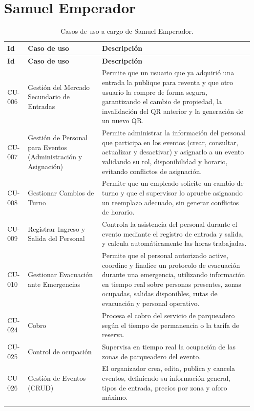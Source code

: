 \documentclass[11pt,a4paper]{article}
\begin{document}
\newpage

\section{Samuel Emperador}

\begin{longtable}{P{1.6cm}P{4cm}P{9.4cm}}
\toprule
\textbf{Id} & \textbf{Caso de uso} & \textbf{Descripción}\\
\midrule
\endfirsthead
\toprule
\textbf{Id} & \textbf{Caso de uso} & \textbf{Descripción}\\
\midrule
\endhead

CU-006 & Gestión del Mercado Secundario de Entradas &
Permite que un usuario que ya adquirió una entrada la publique para reventa y que otro usuario
la compre de forma segura, garantizando el cambio de propiedad, la invalidación del QR anterior
y la generación de un nuevo QR.\\[0.5em]

CU-007 & Gestión de Personal para Eventos (Administración y Asignación) &
Permite administrar la información del personal que participa en los eventos (crear, consultar,
actualizar y desactivar) y asignarlo a un evento validando su rol, disponibilidad y horario,
evitando conflictos de asignación.\\[0.5em]

CU-008 & Gestionar Cambios de Turno &
Permite que un empleado solicite un cambio de turno y que el supervisor lo apruebe asignando un
reemplazo adecuado, sin generar conflictos de horario.\\[0.5em]

CU-009 & Registrar Ingreso y Salida del Personal &
Controla la asistencia del personal durante el evento mediante el registro de entrada y salida,
y calcula automáticamente las horas trabajadas.\\[0.5em]

CU-010 & Gestionar Evacuación ante Emergencias &
Permite que el personal autorizado active, coordine y finalice un protocolo de evacuación
durante una emergencia, utilizando información en tiempo real sobre personas presentes, zonas
ocupadas, salidas disponibles, rutas de evacuación y personal operativo.\\[0.5em]

CU-024 & Cobro &
Procesa el cobro del servicio de parqueadero según el tiempo de permanencia o la tarifa de
reserva.\\[0.5em]

CU-025 & Control de ocupación &
Supervisa en tiempo real la ocupación de las zonas de parqueadero del evento.\\[0.5em]

CU-026 & Gestión de Eventos (CRUD) &
El organizador crea, edita, publica y cancela eventos, definiendo su información general, tipos
de entrada, precios por zona y aforo máximo.\\
\bottomrule
\caption{Casos de uso a cargo de Samuel Emperador.}
\end{longtable}
\end{document}
